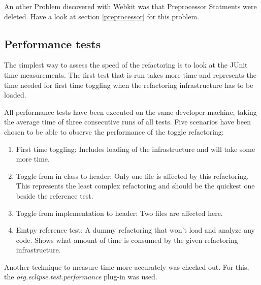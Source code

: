 An other Problem discovered with Webkit was that Preprocessor Statments were
deleted. Have a look at section \ref{preprocessor} for this problem.

\subsection{Performance tests}

The simplest way to assess the speed of the refactoring is to look at the JUnit
time measurements. The first test that is run takes more time and represents the 
time needed for first time toggling when the refactoring infrastructure has to 
be loaded. 

All performance tests have been executed on the same developer machine, taking
the average time of three consecutive runs of all tests. Five scenarios have
been chosen to be able to observe the performance of the toggle refactoring:

\begin{enumerate}
\item First time toggling: Includes loading of the infrastructure and will take 
some more time.
\item Toggle from in class to header: Only one file is affected by this 
refactoring. This represents the least complex refactoring and should be the 
quickest one beside the reference test.
\item Toggle from implementation to header: Two files are affected here.
\item Emtpy reference test: A dummy refactoring that won't load and analyze any 
code. Shows what amount of time is consumed by the given refactoring 
infrastructure.
\end{enumerate}

Another technique to measure time more accurately was checked out. For this, the 
\textit{org.eclipse.test.performance} plug-in was used.

